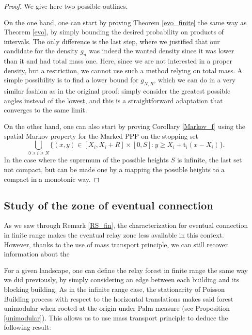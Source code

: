 \documentclass[10pt,english,a4paper]{smfart}
\theoremstyle{definition}
\theoremstyle{remark}
\begin{document}
\begin{proof}
We give here two possible outlines. 

On the one hand, one can start by proving Theorem \ref{evo_finite} the same way as Theorem \ref{evo}, by simply bounding the desired probability on products of intervals. The only difference is the last step, where we justified that our candidate for the density $g_n$ was indeed the wanted density since it was lower than it and had total mass one. Here, since we are not interested in a proper density, but a restriction, we cannot use such a method relying on total mass. A simple possibility is to find a lower bound for $g_{N, R}$, which we can do in a very similar fashion as in the original proof: simply consider the greatest possible angles instead of the lowest, and this is a straightforward adaptation that converges to the same limit.

On the other hand, one can also start by proving Corollary \ref{Markov_f} using the spatial Markov property for the Marked PPP on the stopping set
\[\displaystyle\bigcup_{0\geq i\geq N}\{(x, y)\in [X_i, X_i+R]\times [0, S]: y\geq X_i + \mathrm{t}_i(x-X_i)\}.\]
In the case where the supremum of the possible heights $S$ is infinite, the last set not compact, but can be made one by a mapping the possible heights to a compact in a monotonic way.
\end{proof}

\subsection{Study of the zone of eventual connection}\label{ev_co_fini}
As we saw through Remark \ref{RS_fin}, the characterization for eventual connection in finite range makes the eventual relay zone less available in this context. However, thanks to the use of mass transport principle, we can still recover information about the 

For a given landscape, one can define the relay forest in finite range the same way we did previously, by simply considering an edge between each building and its blocking building. As in the infinite range case, the stationarity of Poisson Building process with respect to the horizontal translations makes said forest unimodular when rooted at the origin under Palm measure (see Proposition \ref{unimodular}). This allows us to use mass transport principle to deduce the following result:
\end{document}
